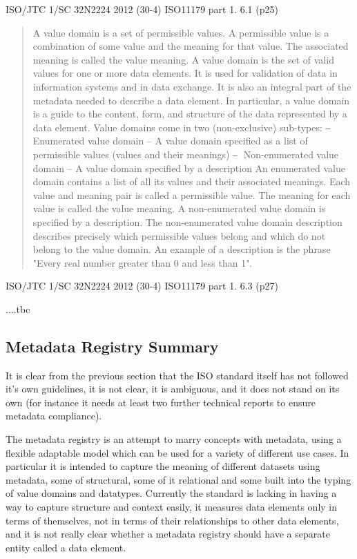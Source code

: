 \documentclass{article}
\begin{document}
ISO/JTC 1/SC 32N2224
2012 (30-4) ISO11179 part 1. 6.1 (p25)
\begin{quote}
	A value domain is a set of permissible values. A permissible value is a combination of some value and the
	meaning for that value. The associated meaning is called the value meaning. A value domain is the set of
	valid values for one or more data elements. It is used for validation of data in information systems and in data
	exchange. It is also an integral part of the metadata needed to describe a data element. In particular, a value
	domain is a guide to the content, form, and structure of the data represented by a data element.
	Value domains come in two (non-exclusive) sub-types:
	⎯ Enumerated value domain – A value domain specified as a list of permissible values (values and their meanings)
	⎯ Non-enumerated value domain – A value domain specified by a description
	An enumerated value domain contains a list of all its values and their associated meanings. Each value and
	meaning pair is called a permissible value. The meaning for each value is called the value meaning.
	A non-enumerated value domain is specified by a description. The non-enumerated value domain
	description describes precisely which permissible values belong and which do not belong to the value
	domain. An example of a description is the phrase "Every real number greater than 0 and less than 1".
\end{quote}
ISO/JTC 1/SC 32N2224
2012 (30-4) ISO11179 part 1. 6.3 (p27)



....tbc


\subsection{Metadata Registry Summary}

It is clear from the previous section that the ISO standard itself has not followed it's own guidelines, it is not clear, it is ambiguous, and it does not stand on its own (for instance it needs at least two further technical reports to ensure metadata compliance). 

The metadata registry is an attempt to marry concepts with metadata, using a flexible adaptable model which can be used for a variety of different use cases. In particular it is intended to capture the meaning of different datasets using metadata, some of structural, some of it relational and some built into the typing of value domains and datatypes.  Currently the standard is lacking in having a way to capture structure and context easily, it measures data elements only in terms of themselves, not in terms of their relationships to other data elements, and it is not really clear whether a metadata registry should have a separate entity called a data element.
\end{document}
